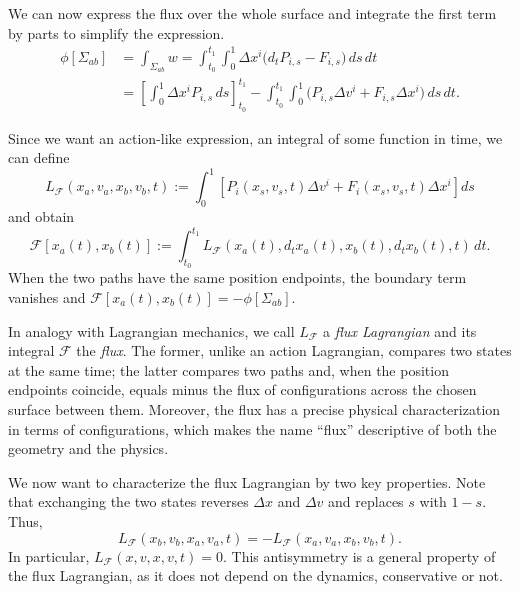 \documentclass[nofootinbib,aps,pre]{revtex4-2}
\begin{document}
We can now express the flux over the whole surface and integrate the first term by parts to simplify the expression.
\begin{equation}
	\begin{aligned}
		\phi[\Sigma_{ab}]
		&= \int_{\Sigma_{ab}} w = 
		\int_{t_0}^{t_1}\int_0^1
		\Delta x^i\bigl(d_tP_{i,s}-F_{i,s}\bigr)\,ds\,dt\\
		&=
		\left[
		\int_0^1\Delta x^iP_{i,s}\,ds
		\right]_{t_0}^{t_1}
		-
		\int_{t_0}^{t_1}\int_0^1
		\bigl(P_{i,s}\Delta v^i+F_{i,s}\Delta x^i\bigr)\,ds\,dt.
	\end{aligned}
\end{equation}

Since we want an action-like expression, an integral of some function in time, we can define
\begin{equation}\label{eq:properFluxLagrangian}
	L_{\mathcal{F}}(x_a,v_a,x_b,v_b,t)
	:=
	\int_0^1
	\left[
	P_i(x_s,v_s,t)\Delta v^i
	+F_i(x_s,v_s,t)\Delta x^i
	\right]ds
\end{equation}
and obtain
\begin{equation}\label{eq:fluxLagrangianFlux}
	\mathcal{F}[x_a(t),x_b(t)]
	:=
	\int_{t_0}^{t_1}L_{\mathcal{F}}(x_a(t),d_t x_a(t),x_b(t),d_t x_b(t),t)\,dt.
\end{equation}
When the two paths have the same position endpoints, the boundary term vanishes and $\mathcal{F}[x_a(t),x_b(t)]=-\phi[\Sigma_{ab}]$.

In analogy with Lagrangian mechanics, we call $L_{\mathcal{F}}$ a \emph{flux Lagrangian} and its integral $\mathcal{F}$ the \emph{flux}. The former, unlike an action Lagrangian, compares two states at the same time; the latter compares two paths and, when the position endpoints coincide, equals minus the flux of configurations across the chosen surface between them. Moreover, the flux has a precise physical characterization in terms of configurations, which makes the name ``flux'' descriptive of both the geometry and the physics.

We now want to characterize the flux Lagrangian by two key properties. Note that exchanging the two states reverses $\Delta x$ and $\Delta v$ and replaces $s$ with $1-s$. Thus,
\begin{equation}\label{eq:fluxLagrangianAntisymmetry}
	L_{\mathcal{F}}(x_b,v_b,x_a,v_a,t)
	=
	-L_{\mathcal{F}}(x_a,v_a,x_b,v_b,t).
\end{equation}
In particular, $L_{\mathcal{F}}(x,v,x,v,t)=0$. This antisymmetry is a general property of the flux Lagrangian, as it does not depend on the dynamics, conservative or not.
\end{document}
